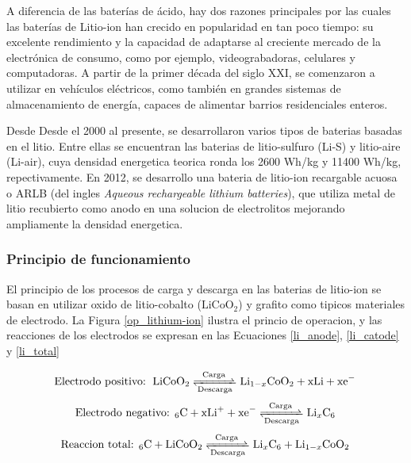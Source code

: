 \documentclass[10pt,a4paper]{article}
\newcommand\reaction[1]{\begin{equation}\ce{#1}\end{equation}}
\begin{document}
    \noindent A diferencia de las baterías de ácido, hay dos razones principales por las 
    cuales las baterías de Litio-ion han crecido en popularidad en tan poco 
    tiempo: su excelente rendimiento y la capacidad de adaptarse al creciente 
    mercado de la electrónica de consumo, como por ejemplo, videograbadoras, 
    celulares y computadoras. A partir de la primer década del siglo XXI, se 
    comenzaron a utilizar en vehículos eléctricos, como también en grandes 
    sistemas de almacenamiento de energía, capaces de alimentar barrios 
    residenciales enteros.
    
    \noindent Desde Desde el 2000 al presente, se desarrollaron varios
    tipos de baterias basadas en el litio. Entre ellas se encuentran las
    baterias de litio-sulfuro (Li-S) y litio-aire (Li-air), cuya densidad
    energetica teorica ronda los 2600 Wh/kg y 11400 Wh/kg, repectivamente. En
    2012, se desarrollo una bateria de litio-ion recargable acuosa o ARLB (del
    ingles \emph{Aqueous rechargeable lithium batteries}), 
    que utiliza metal de litio recubierto como anodo en una solucion de 
    electrolitos mejorando ampliamente la densidad energetica.

    \subsubsection{Principio de funcionamiento}

    El principio de los procesos de carga y descarga en las baterias de
    litio-ion se basan en utilizar oxido de litio-cobalto ($\mathrm{LiCoO_2}$)
    y grafito como tipicos materiales de electrodo. La Figura
    \ref{op_lithium-ion} ilustra el princio de operacion, y las reacciones de
    los electrodos se expresan en  las Ecuaciones \ref{li_anode}, 
    \ref{li_catode} y \ref{li_total}

    \reaction{\text{Electrodo positivo: } LiCoO2 <=>[Carga][Descarga] Li_{1-x}CoO2 + xLi + xe^- \label{li_anode}}
    \reaction{\text{Electrodo negativo: }6C + xLi^+ + xe^- <=>[Carga][Descarga] Li_{x}C6 \label{li_catode}}
    \reaction{\text{Reaccion total: }6C + LiCoO2 <=>[Carga][Descarga] Li_{x}C6 + Li_{1-x}CoO2 \label{li_total}}
\end{document}
